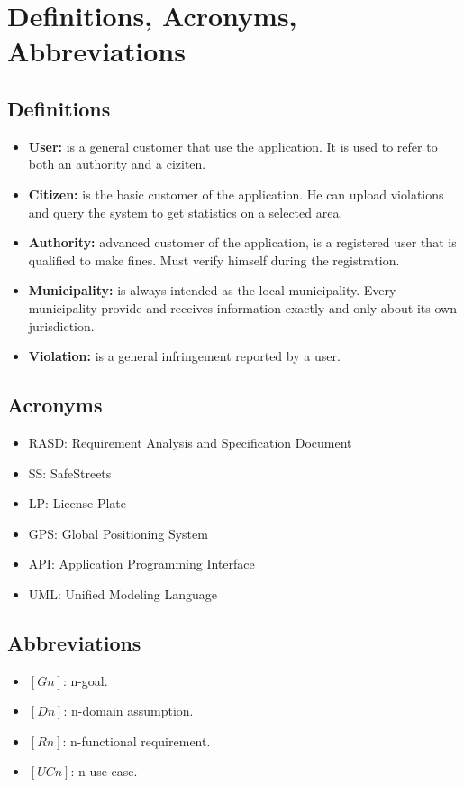 \documentclass[../RASD.tex]{subfiles}
\begin{document}
    \section{Definitions, Acronyms, Abbreviations}\label{sec:definitions,-acronyms,-abbreviations}
    \subsection{Definitions}\label{subsec:definitions}
    \begin{itemize}
        \item \textbf{User:} is a general customer that use the application. It is used to refer to both an authority and a ciziten.
        \item \textbf{Citizen:} is the basic customer of the application. He can upload violations and query the system to get statistics on a selected area.
        \item \textbf{Authority:} advanced customer of the application, is a registered user that is qualified to make fines. Must verify himself during the registration.
        \item \textbf{Municipality:} is always intended as the local municipality. Every municipality provide and receives information exactly and only about its own jurisdiction.
        \item \textbf{Violation:} is a general infringement reported by a user.
    \end{itemize}

    \subsection{Acronyms}\label{subsec:acronyms}
    \begin{itemize}
        \item RASD: Requirement Analysis and Specification Document
        \item SS: SafeStreets
        \item LP: License Plate
        \item GPS: Global Positioning System
        \item API: Application Programming Interface
        \item UML: Unified Modeling Language
    \end{itemize}

    \subsection{Abbreviations}\label{subsec:abbreviations}
    \begin{itemize}
        \item $[Gn]$: n-goal.
        \item $[Dn]$: n-domain assumption.
        \item $[Rn]$: n-functional requirement.
        \item $[UCn]$: n-use case.
    \end{itemize}
\end{document}

